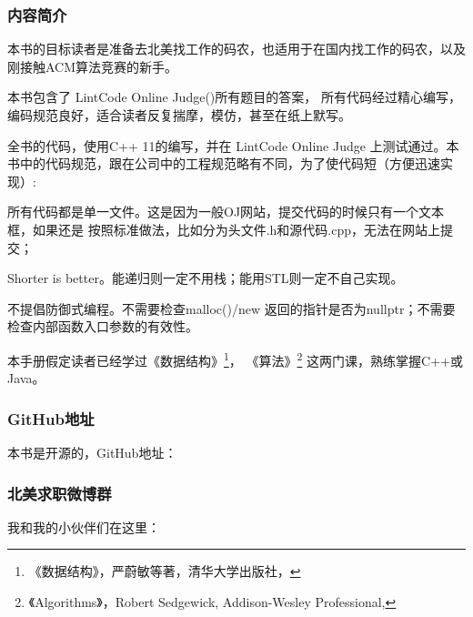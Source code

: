 \subsubsection{内容简介}
本书的目标读者是准备去北美找工作的码农，也适用于在国内找工作的码农，以及刚接触ACM算法竞赛的新手。

本书包含了 LintCode Online Judge()所有题目的答案，
所有代码经过精心编写，编码规范良好，适合读者反复揣摩，模仿，甚至在纸上默写。

全书的代码，使用C++ 11的编写，并在 LintCode Online Judge 上测试通过。本书中的代码规范，跟在公司中的工程规范略有不同，为了使代码短（方便迅速实现）:

\begindot
\item 所有代码都是单一文件。这是因为一般OJ网站，提交代码的时候只有一个文本框，如果还是
按照标准做法，比如分为头文件.h和源代码.cpp，无法在网站上提交；

\item Shorter is better。能递归则一定不用栈；能用STL则一定不自己实现。

\item 不提倡防御式编程。不需要检查malloc()/new 返回的指针是否为nullptr；不需要检查内部函数入口参数的有效性。
\myenddot

本手册假定读者已经学过《数据结构》\footnote{《数据结构》，严蔚敏等著，清华大学出版社，
}，
《算法》\footnote{《Algorithms》，Robert Sedgewick, Addison-Wesley Professional, }
这两门课，熟练掌握C++或Java。

\subsubsection{GitHub地址}
本书是开源的，GitHub地址：

\subsubsection{北美求职微博群}
我和我的小伙伴们在这里：
